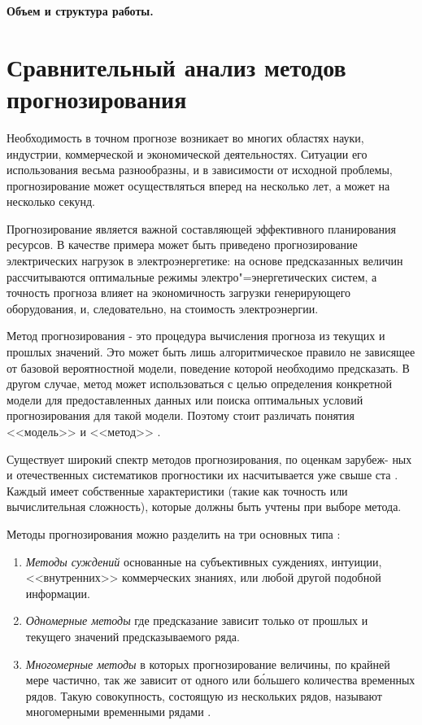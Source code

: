 \documentclass[a4paper,14pt,russian]{extreport}
\begin{document}
{\bfseries Объем и структура работы.} 


\chapter{Сравнительный анализ методов прогнозирования}
Необходимость в точном прогнозе возникает во многих областях науки, 
индустрии, коммерческой и экономической деятельностях. Ситуации его 
использования весьма разнообразны, и в зависимости от исходной проблемы, 
прогнозирование может осуществляться вперед на несколько лет, а может на 
несколько секунд. 

Прогнозирование является важной составляющей эффективного планирования 
ресурсов. В качестве примера может быть приведено прогнозирование 
электрических нагрузок в электроэнергетике: на основе предсказанных величин 
рассчитываются оптимальные режимы электро"=энергетических систем, а 
точность прогноза влияет на экономичность загрузки генерирующего 
оборудования, и, следовательно, на стоимость электроэнергии.

Метод прогнозирования - это процедура вычисления прогноза из текущих и 
прошлых значений. Это может быть лишь алгоритмическое правило не 
зависящее от базовой вероятностной модели, поведение которой необходимо 
предсказать. В другом случае, метод может использоваться с целью 
определения конкретной модели для предоставленных данных или поиска 
оптимальных условий прогнозирования для такой модели. Поэтому стоит 
различать понятия <<модель>> и <<метод>> \cite{chatfield2000}. 

Существует широкий спектр методов прогнозирования, по оценкам зарубеж-
ных и отечественных систематиков прогностики их насчитывается
уже свыше ста \cite{tihonov2006}. Каждый имеет собственные характеристики 
(такие как точность или вычислительная сложность), которые должны быть 
учтены при выборе метода.

Методы прогнозирования можно разделить на три основных типа 
\cite{chatfield2000, armstrong1999, brockwell2002, hyndman2012}:
\begin{enumerate}
	\item {\itshape Методы суждений} основанные на субъективных суждениях, 
		интуиции, <<внутренних>> коммерческих знаниях, или любой другой 
		подобной информации.
	\item {\itshape Одномерные методы} где предсказание зависит только от 
		прошлых и текущего значений предсказываемого ряда.
	\item {\itshape Многомерные методы} в которых прогнозирование величины, 
		по крайней мере частично, так же зависит от одного или б\'{о}льшего 
		количества временных рядов. Такую совокупность, состоящую из 
		нескольких рядов, называют многомерными временными рядами 
		\cite{popov2006}.
\end{enumerate}
\end{document}
